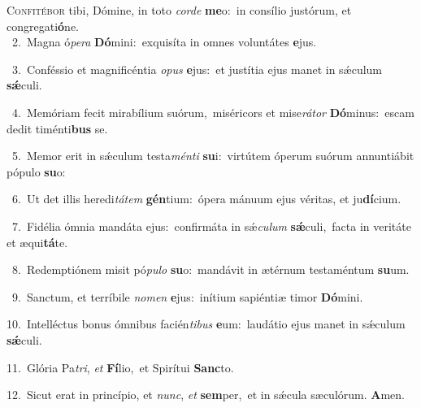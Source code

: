 \lettrine{\initial\textcolor{\initialcolor}{C}}{onfitébor} tibi, Dómine, in toto \textit{cor}\-\textit{de} \textbf{me}\-o:~\star in consílio justórum, et congregati\-\textbf{ó}\-ne.\\
{\numbfont\textcolor{\numbcolor}{~2.}}~Magna ó\-\textit{pe}\-\textit{ra} \textbf{Dó}\-mini:~\star exquisíta in omnes voluntátes \textbf{e}\-jus.\par
{\numbfont\textcolor{\numbcolor}{~3.}}~Conféssio et magnificéntia \textit{o}\-\textit{pus} \textbf{e}\-jus:~\star et justítia ejus manet in sǽculum \textbf{sǽ}\-culi.\par
{\numbfont\textcolor{\numbcolor}{~4.}}~Memóriam fecit mirabílium suórum,~\dagger miséricors et mise\-\textit{rá}\-\textit{tor} \textbf{Dó}\-minus:~\star escam dedit timénti\textbf{bus} se.\par
{\numbfont\textcolor{\numbcolor}{~5.}}~Memor erit in sǽculum testa\-\textit{mén}\-\textit{ti} \textbf{su}\-i:~\star virtútem óperum suórum annuntiábit pópulo \textbf{su}\-o:\par
{\numbfont\textcolor{\numbcolor}{~6.}}~Ut det illis heredi\-\textit{tá}\-\textit{tem} \textbf{gén}\-tium:~\star ópera mánuum ejus véritas, et ju\-\textbf{dí}\-cium.\par
{\numbfont\textcolor{\numbcolor}{~7.}}~Fidélia ómnia mandáta ejus:~\dagger confirmáta in sǽ\-\textit{cu}\-\textit{lum} \textbf{sǽ}\-culi,~\star facta in veritáte et æqui\-\textbf{tá}\-te.\par
{\numbfont\textcolor{\numbcolor}{~8.}}~Redemptiónem misit pó\-\textit{pu}\-\textit{lo} \textbf{su}\-o:~\star mandávit in ætérnum testaméntum \textbf{su}\-um.\par
{\numbfont\textcolor{\numbcolor}{~9.}}~Sanctum, et terríbile \textit{no}\-\textit{men} \textbf{e}\-jus:~\star inítium sapiéntiæ timor \textbf{Dó}\-mini.\par
{\numbfont\textcolor{\numbcolor}{10.}}~Intelléctus bonus ómnibus facién\-\textit{ti}\-\textit{bus} \textbf{e}\-um:~\star laudátio ejus manet in sǽculum \textbf{sǽ}\-culi.\par
{\numbfont\textcolor{\numbcolor}{11.}}~Glória Pa\-\textit{tri}\-, \textit{et} \textbf{Fí}\-lio,~\star et Spirítui \textbf{Sanc}\-to.\par
{\numbfont\textcolor{\numbcolor}{12.}}~Sicut erat in princípio, et \textit{nunc}\-, \textit{et} \textbf{sem}\-per,~\star et in sǽcula sæculórum. \textbf{A}\-men.\par
